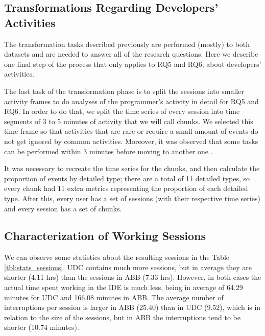 \subsection{Transformations Regarding Developers' Activities}
The transformation tasks described previously are performed (mostly) to both datasets and are needed to answer all of the research questions. Here we describe one final step of the process that only applies to RQ5 and RQ6, about developers' activities.
\begin{changedforreviewerlong}

The last task of the transformation phase is to split the sessions into smaller activity frames to do analyses of the programmer's activity in detail for RQ5 and RQ6. In order to do that, we split the time series of every session into time segments of 3 to 5 minutes of activity that we will call chunks. We selected this time frame so that activities that are rare or require a small amount of events do not get ignored by common activities. Moreover, it was observed that some tasks can be performed within 3 minutes before moving to another one \cite{GM04}.

It was necessary to recreate the time series for the chunks, and then calculate the proportion of events by detailed type; there are a total of 11 detailed types, so every chunk had 11 extra metrics representing the proportion of each detailed type. After this, every user has a set of sessions (with their respective time series) and every session has a set of chunks.
\end{changedforreviewerlong}

\subsection{Characterization of Working Sessions}
We can observe some statistics about the resulting sessions in the Table \ref{tbl:stats_sessions}. UDC contains much more sessions, but in average they are shorter (4.11 hrs) than the sessions in ABB (7.33 hrs). However, in both cases the actual time spent working in the IDE is much less, being in average of 64.29 minutes for UDC and 166.08 minutes in ABB. The average number of interruptions per session is larger in ABB (25.40) than in UDC (9.52), which is in relation to the size of the sessions, but in ABB the interruptions tend to be shorter (10.74 minutes).

